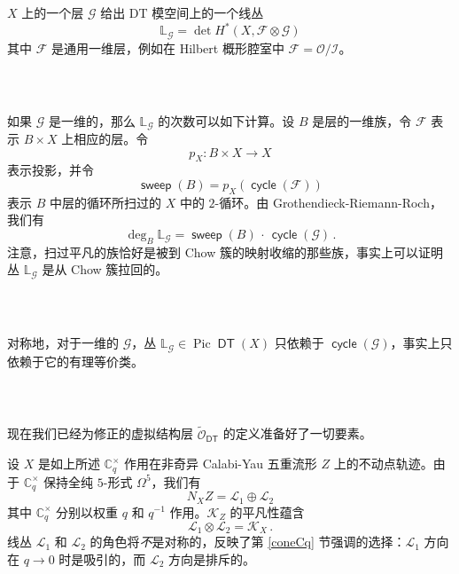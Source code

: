 \documentclass[12pt]{article}
\newcommand{\cO}{\mathscr{O}}
\newcommand{\cL}{\mathscr{L}}
\DeclareMathOperator{\DT}{\mathsf{DT}}
\DeclareMathOperator{\cycle}{\mathsf{cycle}}
\DeclareMathOperator{\sweep}{\mathsf{sweep}}
\DeclareMathOperator{\Pic}{Pic}
\newcommand{\bL}{\mathbb{L}}
\newcommand{\cF}{\mathscr{F}}
\newcommand{\cI}{\mathscr{I}}
\newcommand{\cG}{\mathscr{G}}
\newcommand{\Ct}{\mathbb{C}^{\times}}
\newcommand{\Cq}{\Ct_q}
\newcommand{\tO}{\widetilde{\mathscr{O}}}
\newcommand{\cK}{\mathscr{K}}
\theoremstyle{definition}
\begin{document}
\subsubsection{\ }

$X$ 上的一个层 $\cG$ 给出 DT 模空间上的一个线丛
$$
\bL_{\cG}
= \det H^*(X,\cF \otimes \cG)
$$
其中 $\cF$ 是通用一维层，例如在 Hilbert 概形腔室中 $\cF = \cO/\cI$。

\subsubsection{\ }

如果 $\cG$ 是一维的，那么 $\bL_{\cG}$ 的次数可以如下计算。设 $B$ 是层的一维族，令 $\cF$ 表示 $B \times X$ 上相应的层。令
$$
p_X: B \times X \to X
$$
表示投影，并令
$$
\sweep(B) = p_X \left(\cycle(\cF)\right)
$$
表示 $B$ 中层的循环所扫过的 $X$ 中的 $2$-循环。由 Grothendieck-Riemann-Roch，我们有
\begin{equation}
\deg_{B} \bL_{\cG} = \sweep(B) \, \cdot \, \cycle(\cG) \,.
\label{degbL}
\end{equation}
注意，扫过平凡的族恰好是被到 Chow 簇的映射收缩的那些族，事实上可以证明 \cite{JO} 丛 $\bL_{\cG}$ 是从 Chow 簇拉回的。

\subsubsection{\ }

对称地，对于一维的 $\cG$，丛 $\bL_{\cG}\in \Pic \DT(X)$ 只依赖于 $\cycle(\cG)$，事实上只依赖于它的有理等价类。

\subsubsection{\ }

现在我们已经为修正的虚拟结构层 $\tO_{\DT}$ 的定义准备好了一切要素。

设 $X$ 是如上所述 $\Cq$ 作用在非奇异 Calabi-Yau 五重流形 $Z$ 上的不动点轨迹。由于 $\Cq$ 保持全纯 $5$-形式 $\Omega^5$，我们有
$$
N_{X} Z = \cL_1 \oplus \cL_2
$$
其中 $\Cq$ 分别以权重 $q$ 和 $q^{-1}$ 作用。$\cK_Z$ 的平凡性蕴含
$$
\cL_1 \otimes \cL_2 = \cK_X \,.
$$
线丛 $\cL_1$ 和 $\cL_2$ 的角色将\emph{不}是对称的，反映了第 \ref{coneCq} 节强调的选择：$\cL_1$ 方向在 $q\to 0$ 时是吸引的，而 $\cL_2$ 方向是排斥的。
\end{document}
